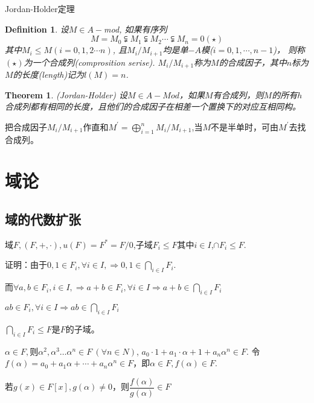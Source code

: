 \documentclass[UTF8]{article}
\newtheorem{thm}{Theorem}[section]
\newtheorem{defn}{Definition}[section]
\begin{document}
\noindent Jordan-Holder定理

\begin{defn}
	

设$M\in A-$mod, 如果有序列
$$M=M_0\subsetneqq M_1\subsetneqq M_2\cdots\subsetneqq M_n=0(\star)$$
其中$M_i\leq M(i=0,1,2\cdots n)$,
且$M_i/M_{i+1}$均是单$-A$模($i=0,1,\cdots,n-1$)，
则称$(\star)$为一个合成列(comprosition serise).
$M_i/M_{i+1}$称为$M$的合成因子，其中$n$标为$M$的长度(length)记为$l(M)=n$.
\end{defn}

\begin{thm}
(Jordan-Holder) 设$M\in A-Mod$，如果$M$有合成列，则$M$的所有$h$合成列都有相同的长度，且他们的合成因子在相差一个置换下的对应互相同构。
\end{thm}
把合成因子$M_{i}/M_{i+1}$作直和$M^{'}=\bigoplus\limits_{i=1}^nM_{i}/M_{i+1}$,当$M$不是半单时，可由$M^{'}$去找合成列。

\section{域论}

\subsection{域的代数扩张}

域$F,(F,+,\cdot),u(F)=F^{*}=F/{0}$,子域$F_{i}\leqslant F$其中$i\in I$,$\cap F_{i}\leqslant F.$


证明：由于$0,1 \in F_{i}, \forall i\in I, \Rightarrow 0,1\in \bigcap\limits_{i\in I}F_i$.

\hspace{11pt}而$\forall a, b \in F_{i}, i\in I, \Rightarrow a+b\in F_i, \forall i\in I\Rightarrow a+b\in\bigcap\limits_{i\in I}F_i$

\hspace{148pt}$ab\in F_i, \forall i\in I\Rightarrow ab\in\bigcap\limits_{i\in I}F_i$

\hspace{27pt} $\bigcap\limits_{i\in I}F_i\leqslant F$是$F$的子域。

$\alpha\in F,$则$\alpha^{2},\alpha^{3} \ldots \alpha^{n} \in F\ (\forall n\in N)$, $a_{0} \cdot 1+a_{1} \cdot \alpha+1+a_{n} \alpha^{n} \in F.$
令$f(\alpha)=a_{0}+a_{1} \alpha+\cdots+a_{n} \alpha^{n} \in F$，即$\alpha\in F, f(\alpha)\in F$.

若$g(x)\in F[x], g(\alpha)\neq 0$，则$\dfrac{f(\alpha)}{g(\alpha)} \in F$
\end{document}
